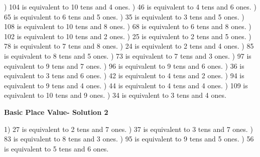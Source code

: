 \documentclass{article}%
\begin{document}
) 104 is equivalent to  10 tens and 4 ones.%
) 46 is equivalent to  4 tens and 6 ones.%
) 65 is equivalent to  6 tens and 5 ones.%
) 35 is equivalent to  3 tens and 5 ones.%
) 108 is equivalent to  10 tens and 8 ones.%
) 68 is equivalent to  6 tens and 8 ones.%
) 102 is equivalent to  10 tens and 2 ones.%
) 25 is equivalent to  2 tens and 5 ones.%
) 78 is equivalent to  7 tens and 8 ones.%
) 24 is equivalent to  2 tens and 4 ones.%
) 85 is equivalent to  8 tens and 5 ones.%
) 73 is equivalent to  7 tens and 3 ones.%
) 97 is equivalent to  9 tens and 7 ones.%
) 96 is equivalent to  9 tens and 6 ones.%
) 36 is equivalent to  3 tens and 6 ones.%
) 42 is equivalent to  4 tens and 2 ones.%
) 94 is equivalent to  9 tens and 4 ones.%
) 44 is equivalent to  4 tens and 4 ones.%
) 109 is equivalent to  10 tens and 9 ones.%
) 34 is equivalent to  3 tens and 4 ones.%
\newline%
\newpage%
\large%
\begin{center}%
\textbf{Basic Place Value- Solution 2}%
\newline%
\end{center} \normalsize%
1) 27 is equivalent to  2 tens and 7 ones.%
) 37 is equivalent to  3 tens and 7 ones.%
) 83 is equivalent to  8 tens and 3 ones.%
) 95 is equivalent to  9 tens and 5 ones.%
) 56 is equivalent to  5 tens and 6 ones.%
\end{document}
